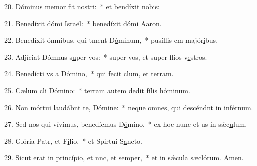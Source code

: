 20. Dóminus memor fit n\uline{o}stri:~* et bendíxit n\uline{o}bis:\par 
21. Benedíxit dómi \uline{I}sraël:~* benedíxit dómi A\uline{a}ron.\par 
22. Benedíxit ómnibus, qui tment D\uline{ó}minum,~* pusíllis cm majór\uline{i}bus.\par 
23. Adjíciat Dómnus s\uline{u}per vos:~* super vos, et super flios v\uline{e}stros.\par 
24. Benedícti vs a D\uline{ó}mino,~* qui fecit clum, et t\uline{e}rram.\par 
25. Cælum cli D\uline{ó}mino:~* terram autem dedit fílis hóm\uline{i}num.\par 
26. Non mórtui laudábnt te, D\uline{ó}mine:~* neque omnes, qui descéndnt in inf\uline{é}rnum.\par 
27. Sed nos qui vívimus, benedícmus D\uline{ó}mino,~* ex hoc nunc et us in sǽc\uline{u}lum.\par 
28. Glória Patr, et F\uline{í}lio,~* et Spirtui S\uline{a}ncto.\par 
29. Sicut erat in princípio, et nnc, et s\uline{e}mper,~* et in sǽcula sæclórum. \uline{A}men.\par 
